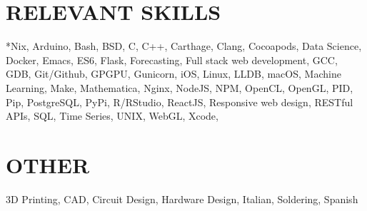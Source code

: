 \documentclass[margin]{../res}
\begin{document}
\begin{resume}
\section{RELEVANT SKILLS}
*Nix, Arduino, Bash, BSD, C, C++, Carthage, Clang, Cocoapods, Data Science, Docker, Emacs,
ES6, Flask, Forecasting,
Full stack web development, GCC, GDB, Git/Github, GPGPU, Gunicorn, iOS, Linux, LLDB,
macOS, Machine
Learning, Make, Mathematica, Nginx, NodeJS, NPM, OpenCL, OpenGL, PID, Pip, PostgreSQL,
PyPi, R/RStudio, ReactJS, Responsive web design, RESTful APIs, SQL, Time Series, UNIX, WebGL, Xcode,

  \section{OTHER}
  3D Printing, CAD, Circuit Design,
  Hardware Design, Italian, Soldering, Spanish
 
\end{resume}
\end{document}
